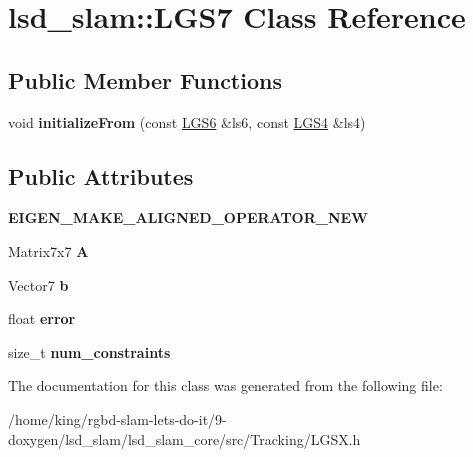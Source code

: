 \hypertarget{classlsd__slam_1_1_l_g_s7}{\section{lsd\-\_\-slam\-:\-:L\-G\-S7 Class Reference}
\label{classlsd__slam_1_1_l_g_s7}
}
\subsection*{Public Member Functions}
\begin{DoxyCompactItemize}
\item 
\hypertarget{classlsd__slam_1_1_l_g_s7_af21bdd9bdbd7997725fe4c1da809e437}{void {\bfseries initialize\-From} (const \hyperlink{classlsd__slam_1_1_l_g_s6}{L\-G\-S6} \&ls6, const \hyperlink{classlsd__slam_1_1_l_g_s4}{L\-G\-S4} \&ls4)}\label{classlsd__slam_1_1_l_g_s7_af21bdd9bdbd7997725fe4c1da809e437}

\end{DoxyCompactItemize}
\subsection*{Public Attributes}
\begin{DoxyCompactItemize}
\item 
\hypertarget{classlsd__slam_1_1_l_g_s7_a047aa7711a2a7276ad380dac78d63ca2}{{\bfseries E\-I\-G\-E\-N\-\_\-\-M\-A\-K\-E\-\_\-\-A\-L\-I\-G\-N\-E\-D\-\_\-\-O\-P\-E\-R\-A\-T\-O\-R\-\_\-\-N\-E\-W}}\label{classlsd__slam_1_1_l_g_s7_a047aa7711a2a7276ad380dac78d63ca2}

\item 
\hypertarget{classlsd__slam_1_1_l_g_s7_aa421de346f4eff019fc35b08560094b0}{Matrix7x7 {\bfseries A}}\label{classlsd__slam_1_1_l_g_s7_aa421de346f4eff019fc35b08560094b0}

\item 
\hypertarget{classlsd__slam_1_1_l_g_s7_a1a52d3afe19079476e89f1d46e0d823c}{Vector7 {\bfseries b}}\label{classlsd__slam_1_1_l_g_s7_a1a52d3afe19079476e89f1d46e0d823c}

\item 
\hypertarget{classlsd__slam_1_1_l_g_s7_ab9569f227f26c8e1d083ddcb4cd59e7d}{float {\bfseries error}}\label{classlsd__slam_1_1_l_g_s7_ab9569f227f26c8e1d083ddcb4cd59e7d}

\item 
\hypertarget{classlsd__slam_1_1_l_g_s7_a9a8103f356a42d715c7aff24c45c54de}{size\-\_\-t {\bfseries num\-\_\-constraints}}\label{classlsd__slam_1_1_l_g_s7_a9a8103f356a42d715c7aff24c45c54de}

\end{DoxyCompactItemize}


The documentation for this class was generated from the following file\-:\begin{DoxyCompactItemize}
\item 
/home/king/rgbd-\/slam-\/lets-\/do-\/it/9-\/doxygen/lsd\-\_\-slam/lsd\-\_\-slam\-\_\-core/src/\-Tracking/L\-G\-S\-X.\-h\end{DoxyCompactItemize}
